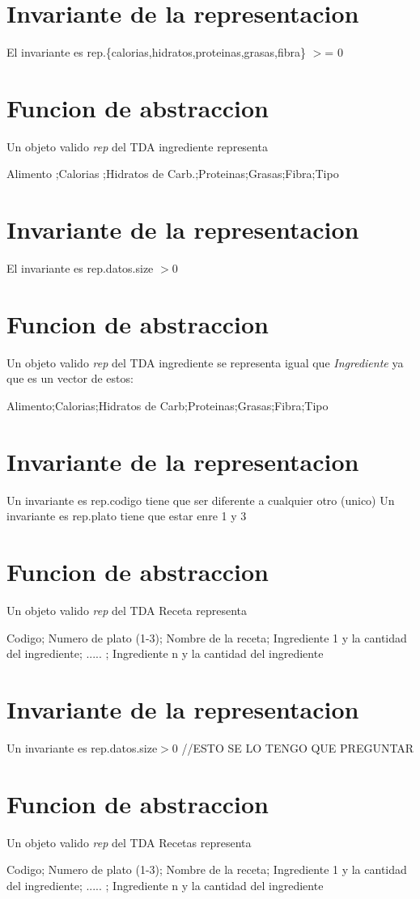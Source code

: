 \hypertarget{repConjunto_invConjunto}{}\section{Invariante de la representacion}\label{repConjunto_invConjunto}
El invariante es rep.\{calorias,hidratos,proteinas,grasas,fibra\} $>$= 0\hypertarget{repConjunto_faConjunto}{}\section{Funcion de abstraccion}\label{repConjunto_faConjunto}
Un objeto valido {\itshape rep} del T\+DA ingrediente representa

Alimento ;Calorias ;Hidratos de Carb.;Proteinas;Grasas;Fibra;Tipo\hypertarget{repConjunto_invConjunto}{}\section{Invariante de la representacion}\label{repConjunto_invConjunto}
El invariante es rep.\+datos.\+size $>$0\hypertarget{repConjunto_faConjunto}{}\section{Funcion de abstraccion}\label{repConjunto_faConjunto}
Un objeto valido {\itshape rep} del T\+DA ingrediente se representa igual que {\itshape Ingrediente} ya que es un vector de estos\+:

Alimento;Calorias;Hidratos de Carb;Proteinas;Grasas;Fibra;Tipo\hypertarget{repConjunto_invConjunto}{}\section{Invariante de la representacion}\label{repConjunto_invConjunto}
Un invariante es rep.\+codigo tiene que ser diferente a cualquier otro (unico) Un invariante es rep.\+plato tiene que estar enre 1 y 3\hypertarget{repConjunto_faConjunto}{}\section{Funcion de abstraccion}\label{repConjunto_faConjunto}
Un objeto valido {\itshape rep} del T\+DA Receta representa

Codigo; Numero de plato (1-\/3); Nombre de la receta; Ingrediente 1 y la cantidad del ingrediente; ..... ; Ingrediente n y la cantidad del ingrediente\hypertarget{repConjunto_invConjunto}{}\section{Invariante de la representacion}\label{repConjunto_invConjunto}
Un invariante es rep.\+datos.\+size$>$0 //\+E\+S\+TO SE LO T\+E\+N\+GO Q\+UE P\+R\+E\+G\+U\+N\+T\+AR\hypertarget{repConjunto_faConjunto}{}\section{Funcion de abstraccion}\label{repConjunto_faConjunto}
Un objeto valido {\itshape rep} del T\+DA Recetas representa

Codigo; Numero de plato (1-\/3); Nombre de la receta; Ingrediente 1 y la cantidad del ingrediente; ..... ; Ingrediente n y la cantidad del ingrediente 